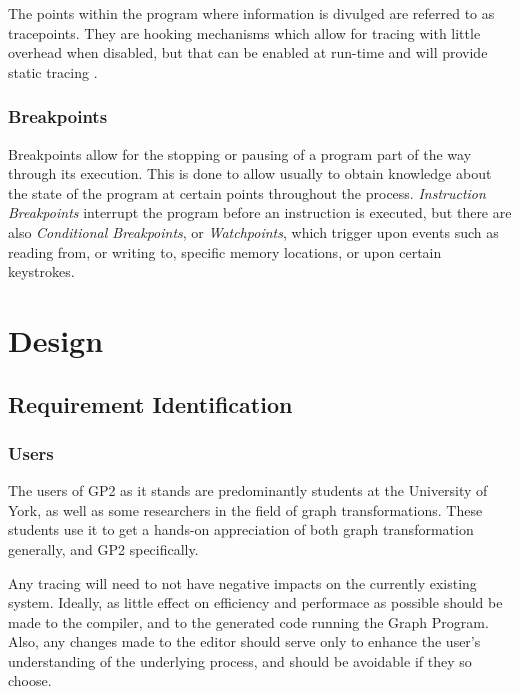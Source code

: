 \documentclass{UoYCSproject}
\begin{document}
The points within the program where information is divulged are referred to as tracepoints. They are hooking mechanisms which allow for tracing with little overhead when disabled, but that can be enabled at run-time and will provide static tracing \cite{tracing_book}.

\subsection{Breakpoints}
Breakpoints allow for the stopping or pausing of a program part of the way through its execution. This is done to allow usually to obtain knowledge about the state of the program at certain points throughout the process. \emph{Instruction Breakpoints} interrupt the program before an instruction is executed, but there are also \emph{Conditional Breakpoints}, or \emph{Watchpoints}, which trigger upon events such as reading from, or writing to, specific memory locations, or upon certain keystrokes.




\chapter{Design}
\section{Requirement Identification}

\subsection{Users}
The users of GP2 as it stands are predominantly students at the University of York, as well as some researchers in the field of graph transformations. These students use it to get a hands-on appreciation of both graph transformation generally, and GP2 specifically.

Any tracing will need to not have negative impacts on the currently existing system. Ideally, as little effect on efficiency and performace as possible should be made to the compiler, and to the generated code running the Graph Program. Also, any changes made to the editor should serve only to enhance the user's understanding of the underlying process, and should be avoidable if they so choose.
\end{document}
